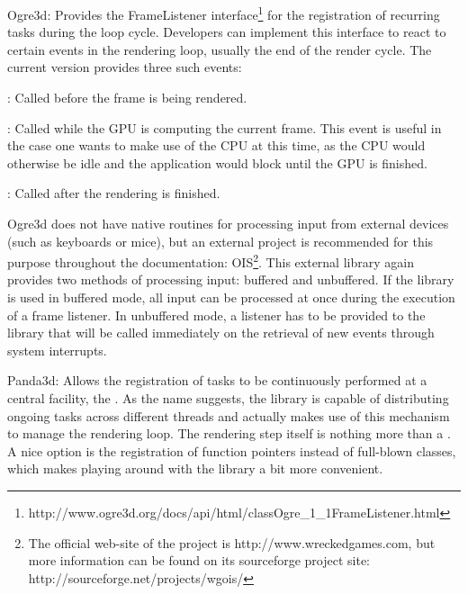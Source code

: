 	\begin{biglist}
		\item Ogre3d: Provides the FrameListener interface\footnote{http://www.ogre3d.org/docs/api/html/classOgre\_1\_1FrameListener.html} for the registration of recurring tasks during the loop cycle. Developers can implement this interface to react to certain events in the rendering loop, usually the end of the render cycle. The current version provides three such events:

		\begin{smalllist}
			\item {}: Called before the frame is being rendered.
			\item {}: Called while the GPU is computing the current frame. This event is useful in the case one wants to make use of the CPU at this time, as the CPU would otherwise be idle and the application would block until the GPU is finished.
			\item {}: Called after the rendering is finished.
		\end{smalllist}

		Ogre3d does not have native routines for processing input from external devices (such as keyboards or mice), but an external project is recommended for this purpose throughout the documentation: OIS\footnote{The official web-site of the project is http://www.wreckedgames.com, but more information can be found on its sourceforge project site: http://sourceforge.net/projects/wgois/}. This external library again provides two methods of processing input: buffered and unbuffered. If the library is used in buffered mode, all input can be processed at once during the execution of a frame listener. In unbuffered mode, a listener has to be provided to the library that will be called immediately on the retrieval of new events through system interrupts.

		\item Panda3d: Allows the registration of tasks to be continuously performed at a central facility, the . As the name suggests, the library is capable of distributing ongoing tasks across different threads and actually makes use of this mechanism to manage the rendering loop. The rendering step itself is nothing more than a . A nice option is the registration of function pointers instead of full-blown classes, which makes playing around with the library a bit more convenient.


\end{biglist}
